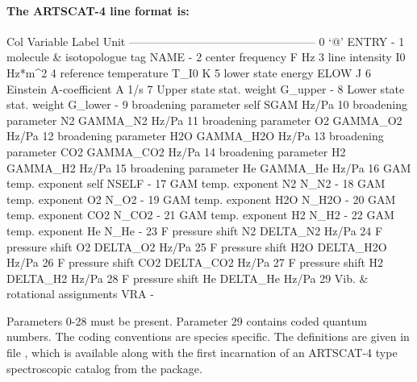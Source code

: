 \paragraph*{The ARTSCAT-4 line format is:}
\begin{code}

Col  Variable                        Label    Unit
--------------------------------------------------
 0   `@'                             ENTRY       -
 1   molecule & isotopologue tag      NAME       -
 2   center frequency                    F      Hz
 3   line intensity                     I0  Hz*m^2
 4   reference temperature            T_I0       K
 5   lower state energy               ELOW       J
 6   Einstein A-coefficient              A     1/s 
 7   Upper state stat. weight      G_upper       -
 8   Lower state stat. weight      G_lower       -
 9   broadening parameter self        SGAM   Hz/Pa
10   broadening parameter N2      GAMMA_N2   Hz/Pa
11   broadening parameter O2      GAMMA_O2   Hz/Pa
12   broadening parameter H2O    GAMMA_H2O   Hz/Pa
13   broadening parameter CO2    GAMMA_CO2   Hz/Pa
14   broadening parameter H2      GAMMA_H2   Hz/Pa
15   broadening parameter He      GAMMA_He   Hz/Pa
16   GAM temp. exponent self         NSELF       -
17   GAM temp. exponent N2            N_N2       -
18   GAM temp. exponent O2            N_O2       -
19   GAM temp. exponent H2O          N_H2O       -
20   GAM temp. exponent CO2          N_CO2       -
21   GAM temp. exponent H2            N_H2       -
22   GAM temp. exponent He            N_He       -
23   F pressure shift N2          DELTA_N2   Hz/Pa
24   F pressure shift O2          DELTA_O2   Hz/Pa   
25   F pressure shift H2O        DELTA_H2O   Hz/Pa   
26   F pressure shift CO2        DELTA_CO2   Hz/Pa   
27   F pressure shift H2          DELTA_H2   Hz/Pa   
28   F pressure shift He          DELTA_He   Hz/Pa   
29   Vib. & rotational assignments     VRA       -                      

\end{code}
Parameters 0-28 must be present. Parameter 29 contains coded quantum numbers.
The coding conventions are species specific. The definitions are given in file
, which is available along with
the first incarnation of an ARTSCAT-4 type spectroscopic catalog from the
 package.


